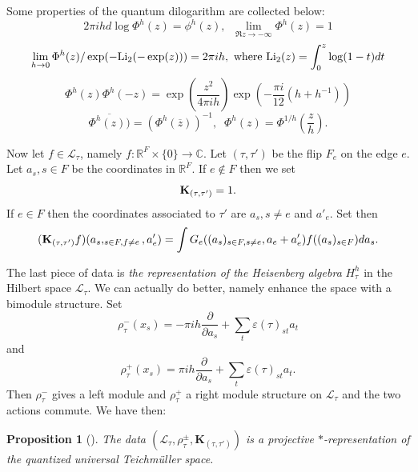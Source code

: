 \documentclass[twoside]{irmaems}
\theoremstyle{plain}
\newtheorem{proposition}[theorem]{Proposition}
\theoremstyle{definition}
\theoremstyle{remark}
\newcommand{\C}{{\mathbb{C}}}
\newcommand{\R}{{\mathbb{R}}}
\begin{document}
\vspace{0.2cm}
\noindent Some properties of the quantum dilogarithm are collected below: 
\[ 2\pi i h d \log \Phi^h(z)=\phi^h(z), \; \;  \lim_{\Re z\to -\infty}\Phi^h(z)=1\]
\[ \lim_{h\to 0}\Phi^h(z)/\exp(-{\rm Li}_2(-\exp(z)))=2\pi i h, \, \, \mbox{\rm where } 
{\rm Li}_2(z)=\int_0^z\log(1-t)dt \]
\[ \Phi^h(z)\Phi^h(-z)=\exp\left(\frac{z^2}{4\pi i h}\right) \exp\left(-\frac{\pi i}{12}(h+h^{-1})\right)\]
\[ 
 \overline{\Phi^h(z))}=\left(\Phi^h\left(\overline{z}\right)\right)^{-1}, \;\; \Phi^h(z)=\Phi^{1/h}\left(\frac{z}{h}\right).\]


\vspace{0.2cm}
\noindent 
Now let  $f\in {\mathcal L}_{\tau}$, namely $f:\R^F\times \{0\}\to \C$. 
Let $(\tau,\tau')$ be the flip $F_e$ on the edge $e$. 
Let $a_s, s\in F$ be the coordinates in $\R^F$. If $e\not\in F$ then we set 
\[ {\bf K}_{(\tau,\tau')}=1.\]
 If $e\in F$ then the coordinates associated to $\tau'$ are $a_s, s\neq e$ and $a'_e$. 
Set then 
\[ ({\bf K}_{(\tau,\tau')} f)(a_s, _{s\in F, f\neq e}, a'_e)= 
\int G_e((a_s)_{s\in F, s\neq e}, a_e+a'_e) f((a_s)_{s\in F}) da_s. \]


\vspace{0.2cm}
\noindent 
The last piece of data is {\em the representation of the Heisenberg algebra} 
$H_{\tau}^h$ in the Hilbert space ${\mathcal L}_{\tau}$. We can 
actually  do better, namely enhance the space with a bimodule structure. 
Set 
\[ \rho^-_{\tau} (x_s) =-\pi i h \frac{\partial}{\partial a_s} + \sum_{t}\varepsilon(\tau)_{st} a_t \]
and 
\[ \rho^+_{\tau} (x_s)=\pi i h \frac{\partial}{\partial a_s} + \sum_{t}\varepsilon(\tau)_{st} a_t. \]
Then $\rho^-_{\tau} $ gives a left module and $\rho^+_{\tau} $ a  right module structure on 
${\mathcal L}_{\tau}$ and the two actions commute. 
We have then: 

\begin{proposition}[\cite{CF,FG3,FG}]
The data $({\mathcal L}_{\tau}, \rho^{\pm}_{\tau}, {\mathbf K}_{(\tau,\tau')})$ 
is a projective $*$-representation of the  quantized universal Teichm\"uller space.   
\end{proposition}
\end{document}
